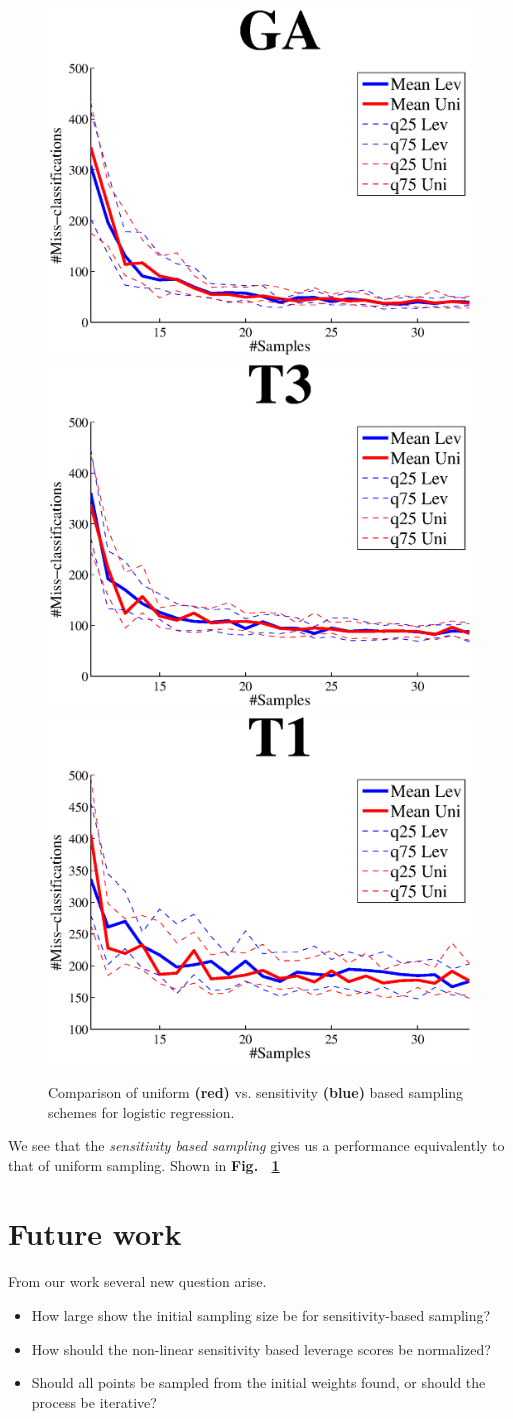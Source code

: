\documentclass{article}
\begin{document}
\begin{figure}[t]
\centering
\includegraphics[width=.49\linewidth]{images/GAsen.eps}
\includegraphics[width=.49\linewidth]{images/T3sen.eps}
\includegraphics[width=.49\linewidth]{images/T1sen.eps}
\caption{Comparison of uniform {\bf\color{red}(red)} vs. sensitivity {\bf\color{blue}(blue)} based sampling schemes for logistic regression.}
\label{fig:SENS_class}
\end{figure}	

We see that the \emph{sensitivity based sampling} gives us a performance  equivalently to that of uniform sampling. Shown in {\bf Fig.~ \ref{fig:SENS_class}}
%
\section{Future work}
From our work several new question arise.
\begin{itemize}
\item How large show the initial sampling size be for sensitivity-based sampling?
\item How should the non-linear sensitivity based leverage scores be normalized? 
\item Should all points be sampled from the initial weights found, or should the process be iterative?
\end{itemize}
%
\end{document}
